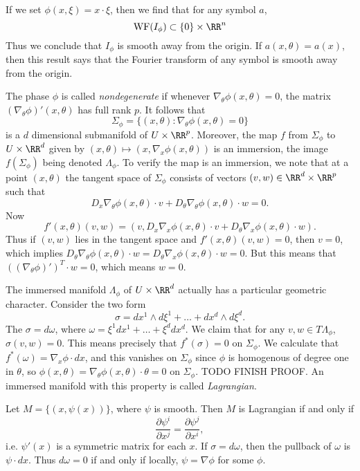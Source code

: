 \begin{example}
    If we set $\phi(x,\xi) = x \cdot \xi$, then we find that for any symbol $a$,
    \[ \text{WF}(I_\phi) \subset \{ 0 \} \times \RR^n \]
    Thus we conclude that $I_\phi$ is smooth away from the origin. If $a(x,\theta) = a(x)$, then this result says that the Fourier transform of any symbol is smooth away from the origin.
\end{example}

The phase $\phi$ is called \emph{nondegenerate} if whenever $\nabla_\theta \phi(x,\theta) = 0$, the matrix $(\nabla_\theta \phi)'(x,\theta)$ has full rank $p$. It follows that
%
\[ \Sigma_\phi = \{ (x,\theta): \nabla_\theta \phi(x,\theta) = 0 \} \]
%
is a $d$ dimensional submanifold of $U \times \RR^p$. Moreover, the map $f$ from $\Sigma_\phi$ to $U \times \RR^d$ given by $(x,\theta) \mapsto (x,\nabla_x \phi(x,\theta))$ is an immersion, the image $f(\Sigma_\phi)$ being denoted $\Lambda_\phi$. To verify the map is an immersion, we note that at a point $(x,\theta)$ the tangent space of $\Sigma_\phi$ consists of vectors $(v,w) \in \RR^d \times \RR^p$ such that
%
\[ D_x \nabla_\theta \phi(x,\theta) \cdot v + D_\theta \nabla_\theta \phi(x,\theta) \cdot w = 0. \]
%
Now
%
\[ f'(x,\theta)(v,w) = (v, D_x \nabla_x \phi(x,\theta) \cdot v + D_\theta \nabla_x \phi(x,\theta) \cdot w ). \]
%
Thus if $(v,w)$ lies in the tangent space and $f'(x,\theta)(v,w) = 0$, then $v = 0$, which implies $D_\theta \nabla_\theta \phi(x,\theta) \cdot w = D_\theta \nabla_x \phi(x,\theta) \cdot w = 0$. But this means that $((\nabla_\theta \phi)')^T \cdot w = 0$, which means $w = 0$.

The immersed manifold $\Lambda_\phi$ of $U \times \RR^d$ actually has a particular geometric character. Consider the two form
%
\[ \sigma = dx^1 \wedge d\xi^1 + \dots + dx^d \wedge d\xi^d. \]
%
The $\sigma = d\omega$, where $\omega = \xi^1 dx^1 + \dots + \xi^d dx^d$. We claim that for any $v,w \in T \Lambda_\phi$, $\sigma(v,w) = 0$. This means precisely that $f^*(\sigma) = 0$ on $\Sigma_\phi$. We calculate that $f^*(\omega) = \nabla_x \phi \cdot dx$, and this vanishes on $\Sigma_\phi$ since $\phi$ is homogenous of degree one in $\theta$, so $\phi(x,\theta) = \nabla_\theta \phi(x,\theta) \cdot \theta = 0$ on $\Sigma_\phi$. TODO FINISH PROOF. An immersed manifold with this property is called \emph{Lagrangian}.

\begin{example}
    Let $M = \{ (x,\psi(x)) \}$, where $\psi$ is smooth. Then $M$ is Lagrangian if and only if
    \[ \frac{\partial \psi^i}{\partial x^j} = \frac{\partial \psi^j}{\partial x^i}, \]
    i.e. $\psi'(x)$ is a symmetric matrix for each $x$. If $\sigma = d\omega$, then the pullback of $\omega$ is $\psi \cdot dx$. Thus $d\omega = 0$ if and only if locally, $\psi = \nabla \phi$ for some $\phi$.
\end{example}

